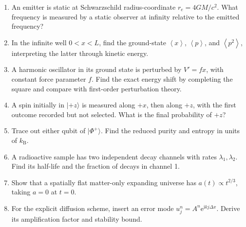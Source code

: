 \documentclass[11pt,oneside]{book}
\newcommand{\ii}{\mathrm{i}}
\newcommand{\ee}{\mathrm{e}}
\newcommand{\avg}[1]{\left\langle #1\right\rangle}
\newcommand{\ket}[1]{\lvert #1\rangle}
\newcommand{\kb}{k_{\mathrm B}}
\theoremstyle{reviewstyle}
\begin{document}
\begin{enumerate}
\item An emitter is static at Schwarzschild radius-coordinate $r_e=4GM/c^2$. What frequency is measured by a static observer at infinity relative to the emitted frequency?
\item In the infinite well $0<x<L$, find the ground-state $\avg x$, $\avg p$, and $\avg{p^2}$, interpreting the latter through kinetic energy.
\item A harmonic oscillator in its ground state is perturbed by $V'=fx$, with constant force parameter $f$. Find the exact energy shift by completing the square and compare with first-order perturbation theory.
\item A spin initially in $\ket{+z}$ is measured along $+x$, then along $+z$, with the first outcome recorded but not selected. What is the final probability of $+z$?
\item Trace out either qubit of $\ket{\Phi^+}$. Find the reduced purity and entropy in units of $\kb$.
\item A radioactive sample has two independent decay channels with rates $\lambda_1,\lambda_2$. Find its half-life and the fraction of decays in channel 1.
\item Show that a spatially flat matter-only expanding universe has $a(t)\propto t^{2/3}$, taking $a=0$ at $t=0$.
\item For the explicit diffusion scheme, insert an error mode $u_j^n=A^n\ee^{\ii kj\Delta x}$. Derive its amplification factor and stability bound.
\end{enumerate}
\end{document}
